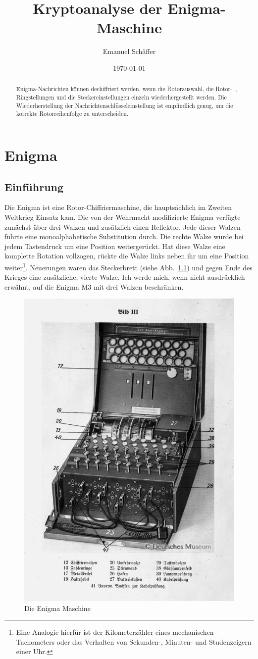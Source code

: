 \documentclass[ngerman, a4paper, footsepline, headsepline]{scrreport}
\newcommand{\figref}[1]{(siehe Abb.~\ref{#1})}
\begin{document}
	\subject{Kryptoanalyse der Enigma-Maschine: Eine Untersuchung des Cyclometers und der Turing-Bombe}
	\title{Kryptoanalyse der Enigma-Maschine}
	\author{Emanuel Schäffer}
	\date{\today}
	\publishers{RWU--University of Applied Sciences}
	\maketitle
	
	\begin{abstract}
		Enigma-Nachrichten können dechiffriert werden, wenn die Rotorauswahl, die Rotor-~, Ringstellungen und die Steckereinstellungen einzeln wiederhergestellt werden. Die Wiederherstellung der Nachrichtenschlüsseleinstellung ist empfindlich genug, um die korrekte Rotorreihenfolge zu unterscheiden. 
	\end{abstract}


	\chapter{Enigma}
	\section{Einführung}
	Die Enigma ist eine Rotor-Chiffriermaschine, die hauptsächlich im Zweiten Weltkrieg Einsatz kam. Die von der Wehrmacht modifizierte Enigma verfügte zunächst über drei Walzen und zusätzlich einen Reflektor. Jede dieser Walzen führte eine monoalphabetische Substitution durch. Die rechte Walze wurde bei jedem Tastendruck um eine Position weitergerückt. Hat diese Walze eine komplette Rotation vollzogen, rückte die Walze links neben ihr um eine Position weiter\footnote{Eine Analogie hierfür ist der Kilometerzähler eines mechanischen Tachometers oder das Verhalten von Sekunden-, Minuten- und Studenzeigern einer Uhr.}. Neuerungen waren das Steckerbrett \figref{fig:enigma_complete} und gegen Ende des Krieges eine zusätzliche, vierte Walze. Ich werde mich, wenn nicht ausdrücklich erwähnt, auf die Enigma M3 mit drei Walzen beschränken.
	\nopagebreak
	\begin{figure}[htbp]
		\centering
		\includegraphics[width=.5\linewidth]{Enigma-komplett.png}
		\caption{Die Enigma Maschine}
		\label{fig:enigma_complete}
	\end{figure}
	
\end{document}
